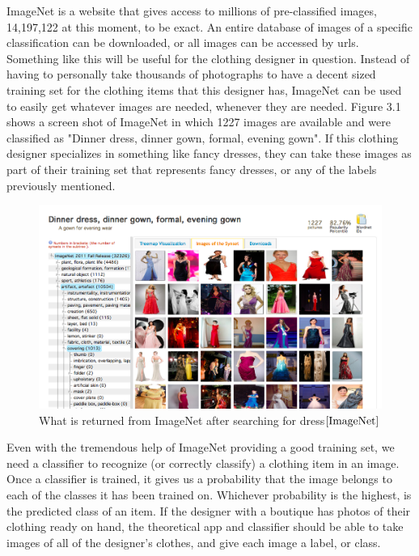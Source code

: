 \documentclass[12pt]{report} %
\begin{document}
	ImageNet \cite{ImageNet} is a website that gives access to millions of pre-classified images, 14,197,122 at this moment, to be exact. An entire database of images of a specific classification can be downloaded, or all images can be accessed by urls. Something like this will be useful for the clothing designer in question. Instead of having to personally take thousands of photographs to have a decent sized training set for the clothing items that this designer has, ImageNet can be used to easily get whatever images are needed, whenever they are needed. Figure 3.1 shows a screen shot of ImageNet in which 1227 images are available and were classified as "Dinner dress, dinner gown, formal, evening gown". If this clothing designer specializes in something like fancy dresses, they can take these images as part of their training set that represents fancy dresses, or any of the labels previously mentioned.
\begin{figure}
\centering
\includegraphics[width=7in]{Imagenet_dress}
\caption{What is returned from ImageNet after searching for dress$\cite{ImageNet}$}
\end{figure}	

	Even with the tremendous help of ImageNet\cite{ImageNet} providing a good training set, we need a classifier to recognize (or correctly classify) a clothing item in an image. Once a classifier is trained, it gives us a probability that the image belongs to each of the classes it has been trained on. Whichever probability is the highest, is the predicted class of an item\cite{KubatMachineLearn}. If the designer with a boutique has photos of their clothing ready on hand, the theoretical app and classifier should be able to take images of all of the designer's clothes, and give each image a label, or class. 
	
\end{document}

